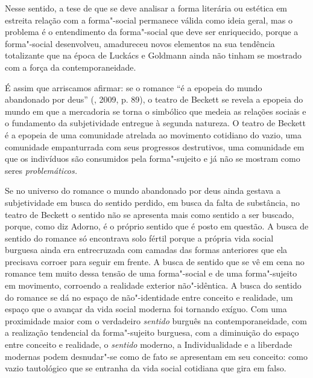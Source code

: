 Nesse sentido, a tese de que se deve analisar a forma literária ou
estética em estreita relação com a forma"-social permanece válida como
ideia geral, mas o problema é o entendimento da forma"-social que deve
ser enriquecido, porque a forma"-social desenvolveu, amadureceu novos
elementos na sua tendência totalizante que na época de Luckács e
Goldmann ainda não tinham se mostrado com a força da contemporaneidade.

É assim que arriscamos afirmar: se o romance ``é a epopeia do mundo
abandonado por deus'' (, 2009, p. 89), o teatro de Beckett se
revela a epopeia do mundo em que a mercadoria se torna o simbólico que
medeia as relações sociais e o fundamento da subjetividade entregue à
segunda natureza. O teatro de Beckett é a epopeia de uma comunidade
atrelada ao movimento cotidiano do vazio, uma comunidade empanturrada
com seus progressos destrutivos, uma comunidade em que os indivíduos são
consumidos pela forma"-sujeito e já não se mostram como seres
\emph{problemáticos.}

Se no universo do romance o mundo abandonado por deus ainda gestava a
subjetividade em busca do sentido perdido, em busca da falta de
substância, no teatro de Beckett o sentido não se apresenta mais como
sentido a ser buscado, porque, como diz Adorno, é o próprio sentido que
é posto em questão. A busca de sentido do romance só encontrava solo
fértil porque a própria vida social burguesa ainda era entrecruzada com
camadas das formas anteriores que ela precisava corroer para seguir em
frente. A busca de sentido que se vê em cena no romance tem muito dessa
tensão de uma forma"-social e de uma forma"-sujeito em movimento,
corroendo a realidade exterior não"-idêntica. A busca do sentido do
romance se dá no espaço de não"-identidade entre conceito e realidade, um
espaço que o avançar da vida social moderna foi tornando exíguo. Com uma
proximidade maior com o verdadeiro \emph{sentido} burguês na
contemporaneidade, com a realização tendencial da forma"-sujeito
burguesa, com a diminuição do espaço entre conceito e realidade, o
\emph{sentido} moderno, a Individualidade e a liberdade modernas podem
desnudar"-se como de fato se apresentam em seu conceito: como vazio
tautológico que se entranha da vida social cotidiana que gira em falso.

